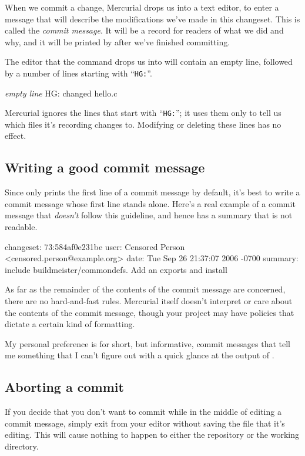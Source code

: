 When we commit a change, Mercurial drops us into a text editor, to
enter a message that will describe the modifications we've made in
this changeset.  This is called the \emph{commit message}.  It will be
a record for readers of what we did and why, and it will be printed by
 after we've finished committing.

The editor that the  command drops us into will contain
an empty line, followed by a number of lines starting with
``\texttt{HG:}''.
\begin{codesample2}
  \emph{empty line}
  HG: changed hello.c
\end{codesample2}
Mercurial ignores the lines that start with ``\texttt{HG:}''; it uses
them only to tell us which files it's recording changes to.  Modifying
or deleting these lines has no effect.

\subsection{Writing a good commit message}

Since  only prints the first line of a commit message by
default, it's best to write a commit message whose first line stands
alone.  Here's a real example of a commit message that \emph{doesn't}
follow this guideline, and hence has a summary that is not readable.
\begin{codesample2}
  changeset:   73:584af0e231be
  user:        Censored Person <censored.person@example.org>
  date:        Tue Sep 26 21:37:07 2006 -0700
  summary:     include buildmeister/commondefs.   Add an exports and install
\end{codesample2}

As far as the remainder of the contents of the commit message are
concerned, there are no hard-and-fast rules.  Mercurial itself doesn't
interpret or care about the contents of the commit message, though
your project may have policies that dictate a certain kind of
formatting.

My personal preference is for short, but informative, commit messages
that tell me something that I can't figure out with a quick glance at
the output of .

\subsection{Aborting a commit}

If you decide that you don't want to commit while in the middle of
editing a commit message, simply exit from your editor without saving
the file that it's editing.  This will cause nothing to happen to
either the repository or the working directory.

